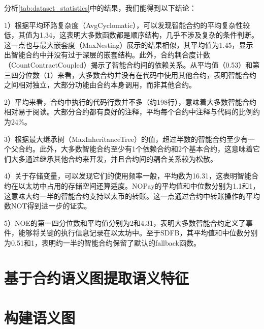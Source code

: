 分析\autoref{tab:dataset_statistics}中的结果，我们能得到以下结论：

1）根据平均环路复杂度（AvgCyclomatic），可以发现智能合约的平均复杂性较低，其值为1.34，这表明大多数函数都是顺序结构，几乎不涉及复杂的条件判断。这一点也与最大嵌套度（MaxNesting）展示的结果相似，其平均值为1.45，显示出智能合约中并没有过于深层的嵌套结构。此外，合约耦合度计数（CountContractCoupled）揭示了智能合约间的依赖关系。从平均值（0.53）和第三四分位数（1）来看，大多数合约并没有在代码中使用其他合约，表明智能合约之间相对独立，大部分功能由合约本身调用，而非其他合约。

2）平均来看，合约中执行的代码行数并不多（约198行），意味着大多数智能合约相对易于阅读。大部分合约都有良好的注释，平均每个合约中注释与代码的比例约为24\%。

3）根据最大继承树（MaxInheritanceTree）的值，超过半数的智能合约至少有一个父合约。此外，大多数智能合约至少有1个依赖合约和2个基本合约，这意味着它们大多通过继承其他合约来开发，并且合约间的耦合关系较为松散。

4）关于存储变量，可以发现它们的使用频率一般，平均数为16.31，这表明智能合约在以太坊中占用的存储空间还算适度。NOPay的平均值和中位数分别为1.1和1，这意味大约一半的智能合约支持以太币的转账。这一点通过合约中转账操作的平均数NOT得到进一步的证实。

5）NOE的第一四分位数和平均值分别为2和4.31，表明大多数智能合约定义了事件，能够将关键的执行信息记录在以太坊中。至于SDFB，其平均值和中位数分别为0.51和1，表明约一半的智能合约保留了默认的fallback函数。
\section{基于合约语义图提取语义特征}
\section{构建语义图}
\label{sec:构建语义图}

